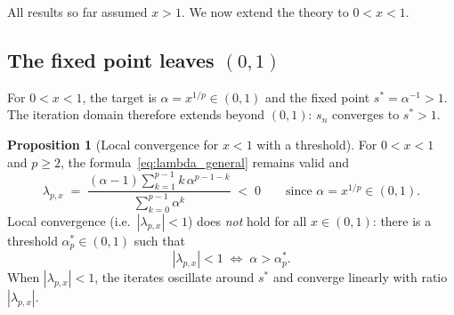 \documentclass[11pt,a4paper]{article}
\theoremstyle{definition}
\newtheorem{proposition}{Proposition}[section]
\begin{document}
All results so far assumed $x > 1$. We now extend the theory to $0 < x < 1$.

\subsection{The fixed point leaves $(0,1)$}

For $0 < x < 1$, the target is $\alpha = x^{1/p} \in (0,1)$ and the fixed point $s^* = \alpha^{-1} > 1$. The iteration domain therefore extends beyond $(0,1)$: $s_n$ converges to $s^* > 1$.

\begin{proposition}[Local convergence for $x < 1$ with a threshold]
\label{prop:x_small}
For $0 < x < 1$ and $p \geq 2$, the formula~\eqref{eq:lambda_general} remains valid and
\[
  \lambda_{p,x}
  \;=\; \frac{(\alpha - 1)\sum_{k=1}^{p-1}k\,\alpha^{p-1-k}}{\sum_{k=0}^{p-1}\alpha^k}
  \;<\; 0
  \qquad \text{since } \alpha = x^{1/p} \in (0,1).
\]
Local convergence (i.e.\ $|\lambda_{p,x}| < 1$) does \emph{not} hold for all $x \in (0,1)$: there is a threshold $\alpha^\ast_p \in (0,1)$ such that
\[
  |\lambda_{p,x}| < 1
  \;\iff\;
  \alpha > \alpha^\ast_p.
\]
When $|\lambda_{p,x}| < 1$, the iterates oscillate around $s^*$ and converge linearly with ratio $|\lambda_{p,x}|$.
\end{proposition}
\end{document}
